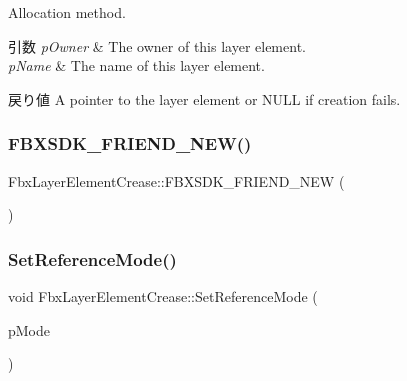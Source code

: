 Allocation method. 
\begin{DoxyParams}{引数}
{\em p\+Owner} & The owner of this layer element. \\
\hline
{\em p\+Name} & The name of this layer element. \\
\hline
\end{DoxyParams}
\begin{DoxyReturn}{戻り値}
A pointer to the layer element or {\ttfamily N\+U\+LL} if creation fails. 
\end{DoxyReturn}
\mbox{\label{class_fbx_layer_element_crease_a5b85454e2b22d8349a2134d00e7bdaea}} 
\subsubsection{\texorpdfstring{F\+B\+X\+S\+D\+K\+\_\+\+F\+R\+I\+E\+N\+D\+\_\+\+N\+E\+W()}{FBXSDK\_FRIEND\_NEW()}}
{\footnotesize\ttfamily Fbx\+Layer\+Element\+Crease\+::\+F\+B\+X\+S\+D\+K\+\_\+\+F\+R\+I\+E\+N\+D\+\_\+\+N\+EW (\begin{DoxyParamCaption}{ }\end{DoxyParamCaption})}

\mbox{\label{class_fbx_layer_element_crease_aa670c1f3cfbcef29d1080b6c9c4e8e34}} 
\subsubsection{\texorpdfstring{Set\+Reference\+Mode()}{SetReferenceMode()}}
{\footnotesize\ttfamily void Fbx\+Layer\+Element\+Crease\+::\+Set\+Reference\+Mode (\begin{DoxyParamCaption}\item[{\hyperlink{class_fbx_layer_element_a00f04654580ca9b2f5d292c11abd83fc}{Fbx\+Layer\+Element\+::\+E\+Reference\+Mode}}]{p\+Mode }\end{DoxyParamCaption})\hspace{0.3cm}{\ttfamily [inline]}}

